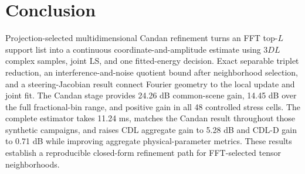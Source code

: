 \section{Conclusion}

Projection-selected multidimensional Candan refinement turns an FFT top-$L$ support list into a continuous coordinate-and-amplitude estimate using $3DL$ complex samples, joint LS, and one fitted-energy decision. Exact separable triplet reduction, an interference-and-noise quotient bound after neighborhood selection, and a steering-Jacobian result connect Fourier geometry to the local update and joint fit. The Candan stage provides 24.26 dB common-scene gain, 14.45 dB over the full fractional-bin range, and positive gain in all 48 controlled stress cells. The complete estimator takes 11.24 ms, matches the Candan result throughout those synthetic campaigns, and raises CDL aggregate gain to 5.28 dB and CDL-D gain to 0.71 dB while improving aggregate physical-parameter metrics. These results establish a reproducible closed-form refinement path for FFT-selected tensor neighborhoods.
